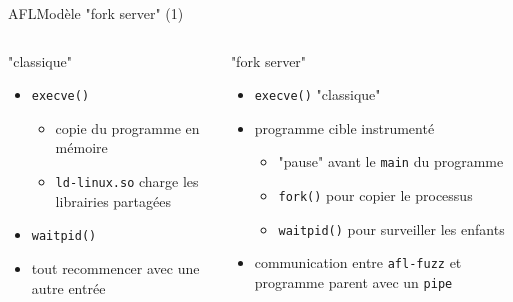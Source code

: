 \begin{frame}{AFL}{Modèle "fork server" (1)}
  \begin{columns}[t]
    \begin{column}{0.49\textwidth}
      \begin{block}{"classique"}
        \begin{itemize}
        \item \lstinline{execve()}
          \begin{itemize}
          \item copie du programme en mémoire
          \item \lstinline{ld-linux.so} charge les librairies partagées
          \end{itemize}
        \item \lstinline{waitpid()}
        \item tout recommencer avec une autre entrée
        \end{itemize}
        \vspace{3.5ex}
      \end{block}
    \end{column}

    \begin{column}{0.49\textwidth}
      \begin{block}{"fork server"}
        \begin{itemize}
        \item \lstinline{execve()} "classique"
        \item programme cible instrumenté
          \begin{itemize}
          \item "pause" avant le \lstinline{main} du programme
          \item \lstinline{fork()} pour copier le processus
          \item \lstinline{waitpid()} pour surveiller les enfants
          \end{itemize}
        \item communication entre \lstinline{afl-fuzz} et programme parent avec un \lstinline{pipe}
        \end{itemize}
      \end{block}
    \end{column}
  \end{columns}
\end{frame}

